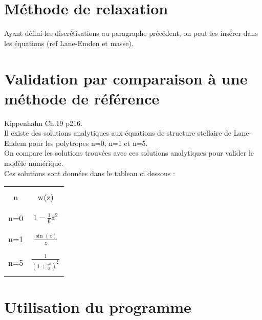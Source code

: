 \documentclass[a4paper,10pt]{article}
\begin{document}
\section{Méthode de relaxation}
Ayant défini les discrétisations au paragraphe précédent, on peut les insérer dans les équations (ref Lane-Emden et masse).


\section{Validation par comparaison à une méthode de référence}
Kippenhahn Ch.19 p216.\\
Il existe des solutions analytiques aux équations de structure stellaire de Lane-Endem pour les polytropes n=0, n=1 et n=5.\\
On compare les solutions trouvées avec ces solutions analytiques pour valider le modèle numérique.\\
Ces solutions sont données dans le tableau ci dessous :\\
\begin{tabular}{cc}
\hline
\\
n & w(z)\\
\\
\hline
\\
n=0 & $1 - \frac{1}{6} z^2$\\
\\
\hline
\\
n=1 & $\frac{\sin(z)}{z}$\\
\\
\hline
\\
n=5 & $\frac{1}{(1+\frac{z^2}{3})^{\frac{1}{2}}}$\\
\\
\hline
\end{tabular}

\section{Utilisation du programme}
\end{document}
